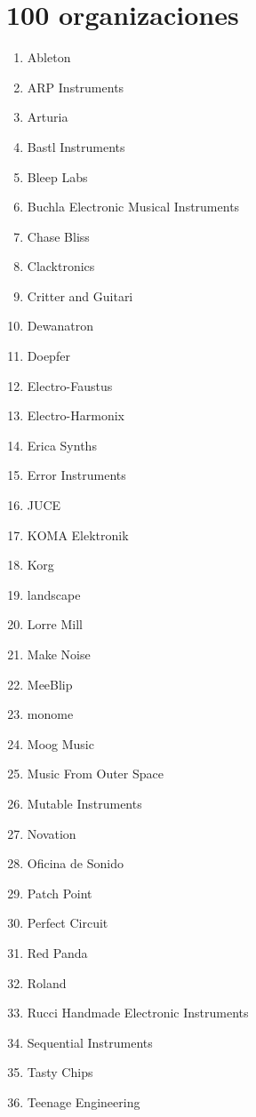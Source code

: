 \documentclass[../principal.tex]{subfiles}
\begin{document}
\chapter{100 organizaciones}

\begin{enumerate}
    \item Ableton
    \item ARP Instruments
    \item Arturia
    \item Bastl Instruments
    \item Bleep Labs
    \item Buchla Electronic Musical Instruments
    \item Chase Bliss
    \item Clacktronics
    \item Critter and Guitari
    \item Dewanatron
    \item Doepfer
    \item Electro-Faustus
    \item Electro-Harmonix
    \item Erica Synths
    \item Error Instruments
    \item JUCE
    \item KOMA Elektronik
    \item Korg
    \item landscape
    \item Lorre Mill
    \item Make Noise
    \item MeeBlip
    \item monome
    \item Moog Music
    \item Music From Outer Space
    \item Mutable Instruments
    \item Novation
    \item Oficina de Sonido
    \item Patch Point
    \item Perfect Circuit
    \item Red Panda
    \item Roland
    \item Rucci Handmade Electronic Instruments
    \item Sequential Instruments
    \item Tasty Chips
    \item Teenage Engineering

\end{enumerate}
\end{document}
